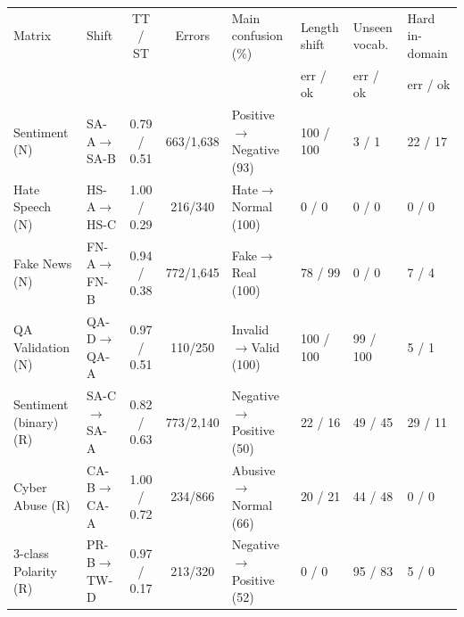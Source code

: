 \begin{tabular}{llccllll}
\toprule
Matrix & Shift & TT / ST & Errors & Main confusion (\%) & Length shift & Unseen vocab. & Hard in-domain \\
 & & & & & err / ok & err / ok & err / ok \\
\midrule
Sentiment (N) & SA-A$\rightarrow$SA-B & 0.79 / 0.51 & 663/1,638 & Positive$\rightarrow$Negative (93) & 100 / 100 & 3 / 1 & 22 / 17 \\
Hate Speech (N) & HS-A$\rightarrow$HS-C & 1.00 / 0.29 & 216/340 & Hate$\rightarrow$Normal (100) & 0 / 0 & 0 / 0 & 0 / 0 \\
Fake News (N) & FN-A$\rightarrow$FN-B & 0.94 / 0.38 & 772/1,645 & Fake$\rightarrow$Real (100) & 78 / 99 & 0 / 0 & 7 / 4 \\
QA Validation (N) & QA-D$\rightarrow$QA-A & 0.97 / 0.51 & 110/250 & Invalid$\rightarrow$Valid (100) & 100 / 100 & 99 / 100 & 5 / 1 \\
Sentiment (binary) (R) & SA-C$\rightarrow$SA-A & 0.82 / 0.63 & 773/2,140 & Negative$\rightarrow$Positive (50) & 22 / 16 & 49 / 45 & 29 / 11 \\
Cyber Abuse (R) & CA-B$\rightarrow$CA-A & 1.00 / 0.72 & 234/866 & Abusive$\rightarrow$Normal (66) & 20 / 21 & 44 / 48 & 0 / 0 \\
3-class Polarity (R) & PR-B$\rightarrow$TW-D & 0.97 / 0.17 & 213/320 & Negative$\rightarrow$Positive (52) & 0 / 0 & 95 / 83 & 5 / 0 \\
\bottomrule
\end{tabular}
